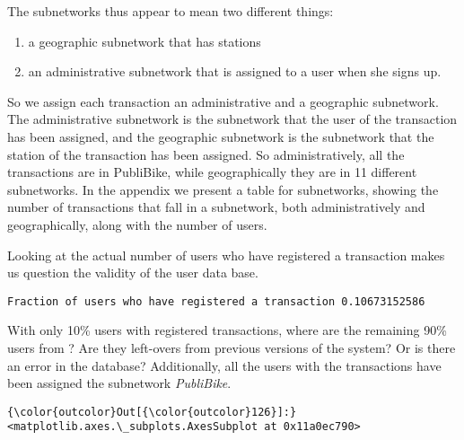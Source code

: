 \documentclass{report}
\begin{document}
    The subnetworks thus appear to mean two different things:

\begin{enumerate}
\def\labelenumi{\arabic{enumi}.}
\item
  a geographic subnetwork that has stations
\item
  an administrative subnetwork that is assigned to a user when she signs
  up.
\end{enumerate}






    So we assign each transaction an administrative and a geographic
subnetwork. The administrative subnetwork is the subnetwork that the
user of the transaction has been assigned, and the geographic subnetwork
is the subnetwork that the station of the transaction has been assigned.
So administratively, all the transactions are in PubliBike, while
geographically they are in 11 different subnetworks. In the appendix we
present a table for subnetworks, showing the number of transactions that
fall in a subnetwork, both administratively and geographically, along
with the number of users.

Looking at the actual number of users who have registered a transaction
makes us question the validity of the user data base.


    \begin{Verbatim}[commandchars=\\\{\}]
Fraction of users who have registered a transaction 0.10673152586
    \end{Verbatim}

    With only 10\% users with registered transactions, where are the
remaining 90\% users from ? Are they left-overs from previous versions
of the system? Or is there an error in the database? Additionally, all
the users with the transactions have been assigned the subnetwork
\emph{PubliBike}.





            \begin{Verbatim}[commandchars=\\\{\}]
{\color{outcolor}Out[{\color{outcolor}126}]:} <matplotlib.axes.\_subplots.AxesSubplot at 0x11a0ec790>
\end{Verbatim}
        
    \begin{center}
    \end{center}
    { \hspace*{\fill} \\}
    
\end{document}
